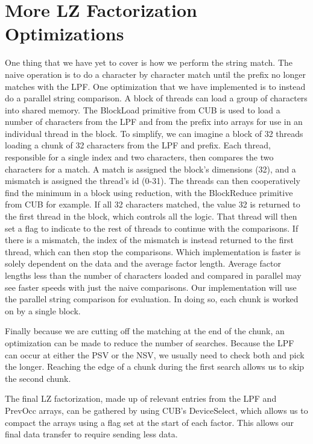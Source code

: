 \section{More LZ Factorization Optimizations}

One thing that we have yet to cover is how we perform the string match.
The naive operation is to do a character by character match until the prefix no longer matches with the LPF.
One optimization that we have implemented is to instead do a parallel string comparison.
A block of threads can load a group of characters into shared memory.
The BlockLoad primitive from CUB is used to load a number of characters from the LPF and from the prefix into arrays for use in an individual thread in the block.
To simplify, we can imagine a block of 32 threads loading a chunk of 32 characters from the LPF and prefix.
Each thread, responsible for a single index and two characters, then compares the two characters for a match.
A match is assigned the block's dimensions (32), and a mismatch is assigned the thread's id (0-31).
The threads can then cooperatively find the minimum in a block using reduction, with the BlockReduce primitive from CUB for example.
If all 32 characters matched, the value 32 is returned to the first thread in the block, which controls all the logic.
That thread will then set a flag to indicate to the rest of threads to continue with the comparisons.
If there is a mismatch, the index of the mismatch is instead returned to the first thread, which can then stop the comparisons.
Which implementation is faster is solely dependent on the data and the average factor length.
Average factor lengths less than the number of characters loaded and compared in parallel may see faster speeds with just the naive comparisons.
Our implementation will use the parallel string comparison for evaluation.
In doing so, each chunk is worked on by a single block.

Finally because we are cutting off the matching at the end of the chunk, an optimization can be made to reduce the number of searches.
Because the LPF can occur at either the PSV or the NSV, we usually need to check both and pick the longer. 
Reaching the edge of a chunk during the first search allows us to skip the second chunk.

The final LZ factorization, made up of relevant entries from the LPF and PrevOcc arrays, can be gathered by using CUB's DeviceSelect, which allows us to compact the arrays using a flag set at the start of each factor.
This allows our final data transfer to require sending less data.
